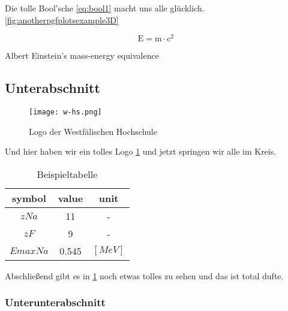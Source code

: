 \noindent Die tolle Bool'sche \cref{eq:bool1} macht uns alle glücklich.\cref{fig:anotherpgfplotsexample3D}

\begin{mycapequ}[!ht]
    \begin{equation}
        \mathrm{E=m\cdot c^2}
        \label{eq:meequi} %
    \end{equation}
    \caption{Albert Einstein's mass-energy equivalence}
\end{mycapequ}

\subsection{Unterabschnitt}\label{subsec:first}

\begin{figure}[!ht]
    \centering
    \texttt{[image: w-hs.png]}
    \captionsetup{width=1.0\linewidth}
    \caption[Logo der Westfälischen Hochschule]{Logo der Westfälischen Hochschule \cite{whs}}
    \label{fig:w-hs} %
\end{figure}

\noindent Und hier haben wir ein tolles Logo \cref{fig:w-hs} und jetzt springen wir alle im Kreis.

\begin{table}[!ht]
\centering
    \begin{tabular}{ | c | c | c | }
        \hline
        symbol & value & unit \\ \hline            
        $z Na$ & 11 & - \\ \hline      
        $z F$ & 9 & - \\ \hline      
        $Emax Na$ & 0.545 & $[MeV]$ \\ \hline
    \end{tabular}
    \caption{Beispieltabelle}
    \label{tab:example} %
\end{table}

\noindent Abschließend gibt es in \cref{tab:example} noch etwas tolles zu sehen und das ist total dufte.

\clearpage

\subsubsection{Unterunterabschnitt}\label{subsubsec:first}


